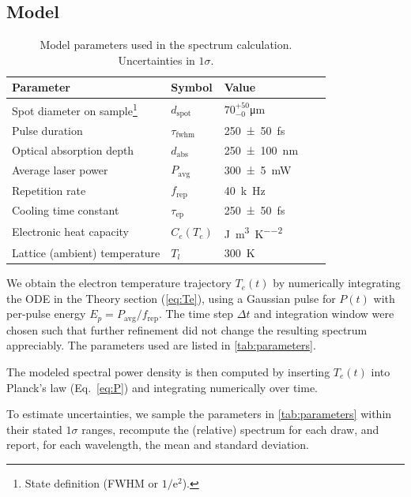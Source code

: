 \documentclass[
	parskip=half,
	a4paper,
]{scrarticle}
\begin{document}
\subsection{Model}
\begin{table}
    \centering
    \begin{tabular}{lllll}
        Parameter & Symbol & Value & \\
        \hline
        Spot diameter on sample\footnote{State definition (FWHM or $1/\mathrm e^2$).} & $d_{\text{spot}}$ & $70^{+50}_{-0}$\;\si{\micro\metre}\\
        Pulse duration & $\tau_\text{fwhm}$ & \SI{250(50)}{fs} & \\
        Optical absorption depth & $d_{\text{abs}}$ & \SI{250(100)}{\nano\metre} &  &  \\
        Average laser power & $P_{\text{avg}}$ & \SI{300(5)}{mW} &  &  \\
        Repetition rate & $f_{\text{rep}}$ & \SI{40}{k\hertz} &  &  \\
        Cooling time constant & $\tau_{\mathrm{ep}}$ & \SI{250(50)}{fs} & \cite{stange_hot_2015} &  \\
        Electronic heat capacity & $C_e(T_e)$ & \si{\joule\per\metre\cubed\per\kelvin\squared} & \cite{nihira_temperature_2003} &  \\
        Lattice (ambient) temperature & $T_l$ & \SI{300}{\kelvin} & &  \\
    \end{tabular}
    \caption{Model parameters used in the spectrum calculation. Uncertainties in $1\sigma$.}
    \label{tab:parameters}
\end{table}

We obtain the electron temperature trajectory $T_e(t)$ by numerically integrating the ODE in the Theory section (\autoref{eq:Te}), using a Gaussian pulse for $P(t)$ with per-pulse energy $E_p = P_{\text{avg}}/f_{\text{rep}}$. The time step $\Delta t$ and integration window were chosen such that further refinement did not change the resulting spectrum appreciably. The parameters used are listed in \autoref{tab:parameters}.

The modeled spectral power density is then computed by inserting $T_e(t)$ into Planck’s law (Eq.~\eqref{eq:P}) and integrating numerically over time.

To estimate uncertainties, we sample the parameters in \autoref{tab:parameters} within their stated $1\sigma$ ranges, recompute the (relative) spectrum for each draw, and report, for each wavelength, the mean and standard deviation.
\end{document}
